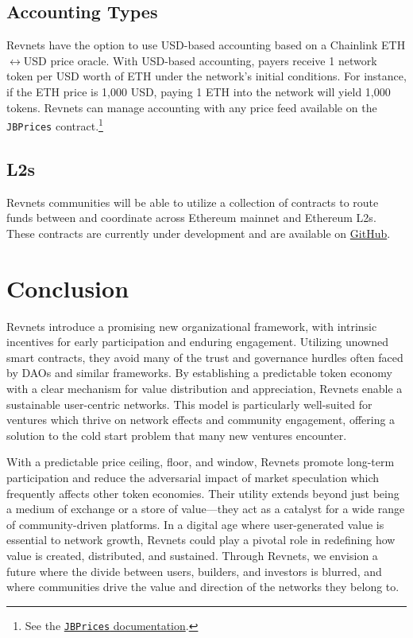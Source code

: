 \documentclass{article}
\begin{document}
\subsection{Accounting Types}\label{sec:accounting_types}

Revnets have the option to use USD-based accounting based on a Chainlink ETH$\leftrightarrow$USD price oracle. With USD-based accounting, payers receive 1 network token per USD worth of ETH under the network's initial conditions. For instance, if the ETH price is 1,000 USD, paying 1 ETH into the network will yield 1,000 tokens. Revnets can manage accounting with any price feed available on the \texttt{JBPrices} contract.\footnote{See the \href{https://docs.juicebox.money/dev/api/contracts/jbprices/}{\texttt{JBPrices} documentation}.}

\subsection{L2s}

Revnets communities will be able to utilize a collection of contracts to route funds between and coordinate across Ethereum mainnet and Ethereum L2s. These contracts are currently under development and are available on \href{https://github.com/Bananapus}{GitHub}.

\section{Conclusion}

Revnets introduce a promising new organizational framework, with intrinsic incentives for early participation and enduring engagement. Utilizing unowned smart contracts, they avoid many of the trust and governance hurdles often faced by DAOs and similar frameworks. By establishing a predictable token economy with a clear mechanism for value distribution and appreciation, Revnets enable a sustainable user-centric networks. This model is particularly well-suited for ventures which thrive on network effects and community engagement, offering a solution to the cold start problem that many new ventures encounter.

With a predictable price ceiling, floor, and window, Revnets promote long-term participation and reduce the adversarial impact of market speculation which frequently affects other token economies. Their utility extends beyond just being a medium of exchange or a store of value---they act as a catalyst for a wide range of community-driven platforms. In a digital age where user-generated value is essential to network growth, Revnets could play a pivotal role in redefining how value is created, distributed, and sustained. Through Revnets, we envision a future where the divide between users, builders, and investors is blurred, and where communities drive the value and direction of the networks they belong to.
\end{document}
